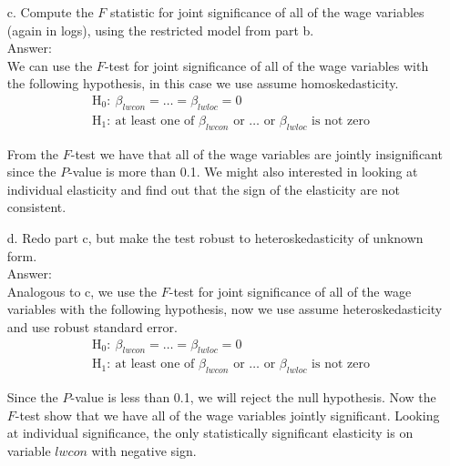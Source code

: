 \documentclass[10pt]{article}
\begin{document}
\begin{enumerate}
\item[c.] Compute the $F$ statistic for joint significance of all of the wage variables (again in logs), using the restricted model from part b.
\\ Answer:\\
We can use the $F$-test for joint significance of all of the wage variables with the following hypothesis, in this case we use assume homoskedasticity.
\begin{align*}
    &\text{H}_0:\ \beta_{lwcon}=\ldots=\beta_{lwloc}=0\\
    &\text{H}_1:\ \text{at least one of }\beta_{lwcon}\text{ or }\ldots\text{ or }\beta_{lwloc} \text{ is not zero}
\end{align*}

From the $F$-test we have that all of the wage variables are jointly insignificant since the $P$-value is more than 0.1. We might also interested in looking at individual elasticity and find out that the sign of the elasticity are not consistent. 

\item[d.] Redo part c, but make the test robust to heteroskedasticity of unknown form.
\\ Answer:\\
Analogous to c, we use the $F$-test for joint significance of all of the wage variables with the following hypothesis, now we use assume heteroskedasticity and use robust standard error.
\begin{align*}
    &\text{H}_0:\ \beta_{lwcon}=\ldots=\beta_{lwloc}=0\\
    &\text{H}_1:\ \text{at least one of }\beta_{lwcon}\text{ or }\ldots\text{ or }\beta_{lwloc} \text{ is not zero}
\end{align*}

Since the $P$-value is less than 0.1, we will reject the null hypothesis. Now the $F$-test show that we have all of the wage variables jointly significant. Looking at individual significance, the only statistically significant elasticity is on variable $lwcon$ with negative sign.
\end{enumerate}
\end{document}

